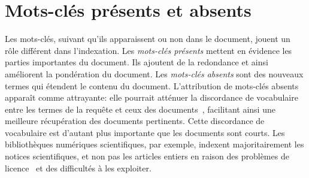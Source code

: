 \section{Mots-clés présents et absents}

Les mots-clés, suivant qu'ils apparaissent ou non dans le document, jouent un rôle différent dans l'indexation.
Les \emph{mots-clés présents} mettent en évidence les parties importantes du document. Ils ajoutent de la redondance et ainsi améliorent la pondération du document. Les \emph{mots-clés absents} sont des nouveaux termes qui étendent le contenu du document. 
L'attribution de mots-clés absents apparaît comme attrayante: elle pourrait atténuer la discordance de vocabulaire entre les termes de la requête et ceux des documents~\cite{furnas_vocabulary_1987}, facilitant ainsi une meilleure récupération des documents pertinents.
Cette discordance de vocabulaire est d'autant plus importante que les documents sont courts. Les bibliothèques numériques scientifiques, par exemple, indexent majoritairement les notices scientifiques, et non pas les articles entiers en raison des problèmes de licence~\cite{huang_holes_2019} et des difficultés à les exploiter.



